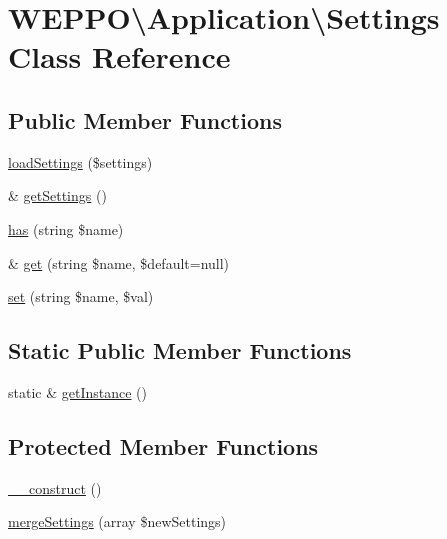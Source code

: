 \hypertarget{classWEPPO_1_1Application_1_1Settings}{}\section{W\+E\+P\+PO\textbackslash{}Application\textbackslash{}Settings Class Reference}
\label{classWEPPO_1_1Application_1_1Settings}
\subsection*{Public Member Functions}
\begin{DoxyCompactItemize}
\item 
\hyperlink{classWEPPO_1_1Application_1_1Settings_a5fdde58045099bacbe6a39eb9232f48c}{load\+Settings} (\$settings)
\item 
\& \hyperlink{classWEPPO_1_1Application_1_1Settings_ae9111bd47c38c8fb2e5264ab51c39de8}{get\+Settings} ()
\item 
\hyperlink{classWEPPO_1_1Application_1_1Settings_a829f07b911e13e87c0ea9de92f768c12}{has} (string \$name)
\item 
\& \hyperlink{classWEPPO_1_1Application_1_1Settings_a5603134cd45b159212865318c39e005d}{get} (string \$name, \$default=null)
\item 
\hyperlink{classWEPPO_1_1Application_1_1Settings_a048f2cc5a512379f14e82ad9f9144b83}{set} (string \$name, \$val)
\end{DoxyCompactItemize}
\subsection*{Static Public Member Functions}
\begin{DoxyCompactItemize}
\item 
static \& \hyperlink{classWEPPO_1_1Application_1_1Settings_a290dd31853a1a113122a091c1d0ade3f}{get\+Instance} ()
\end{DoxyCompactItemize}
\subsection*{Protected Member Functions}
\begin{DoxyCompactItemize}
\item 
\hyperlink{classWEPPO_1_1Application_1_1Settings_a1e3da1a562d1a19f27403141f15900ca}{\+\_\+\+\_\+construct} ()
\item 
\hyperlink{classWEPPO_1_1Application_1_1Settings_a256155e489a920f34a1150997bb2a5af}{merge\+Settings} (array \$new\+Settings)
\end{DoxyCompactItemize}
